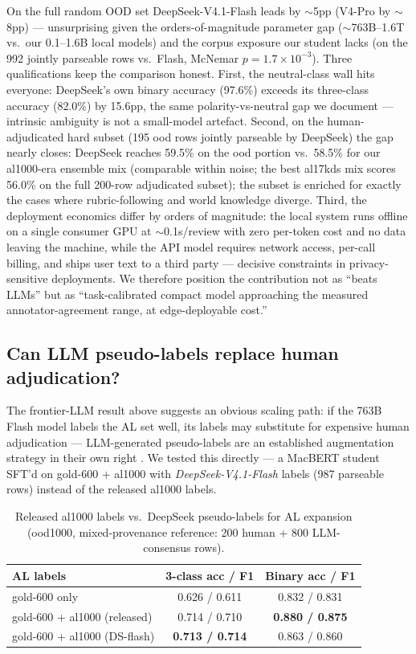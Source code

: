\documentclass[11pt,a4paper]{article}
\begin{document}
On the full random OOD set DeepSeek-V4.1-Flash leads by $\sim$5pp
(V4-Pro by $\sim$8pp) --- unsurprising given the orders-of-magnitude
parameter gap ($\sim$763B--1.6T vs.\ our 0.1--1.6B local models) and
the corpus exposure our student lacks (on the 992
jointly parseable rows vs.\ Flash, McNemar $p = 1.7\times10^{-3}$). Three
qualifications keep the comparison
honest. First, the neutral-class wall hits everyone: DeepSeek's own
binary accuracy (97.6\%) exceeds its three-class accuracy (82.0\%) by
15.6pp, the same polarity-vs-neutral gap we document --- intrinsic
ambiguity is not a small-model artefact. Second, on the human-adjudicated
hard subset (195 ood rows jointly parseable by DeepSeek) the gap
nearly closes: DeepSeek reaches
59.5\% on the ood portion vs.\ 58.5\% for our al1000-era
ensemble mix
(comparable within noise; the best al17kds mix scores 56.0\% on the full
200-row adjudicated subset); the subset is enriched for exactly the
cases
where rubric-following and world knowledge diverge. Third, the
deployment economics differ by orders of magnitude: the local system
runs offline on a single consumer GPU at $\sim$0.1s/review with zero
per-token cost and no data leaving the machine, while the API model
requires network access, per-call billing, and ships user text to a
third party --- decisive constraints in privacy-sensitive deployments.
We therefore position the contribution not as ``beats LLMs'' but as
``task-calibrated compact model approaching the measured
annotator-agreement range, at edge-deployable cost.''

\subsection{Can LLM pseudo-labels replace human adjudication?}
\label{sec:ds-teacher}

The frontier-LLM result above suggests an obvious scaling path: if the
763B Flash model labels the AL set well, its labels may substitute for
expensive human adjudication --- LLM-generated pseudo-labels are an
established augmentation strategy in their own right
\citep{zenimoto2024,neveditsin2025}. We tested this directly --- a
MacBERT
student SFT'd on gold-600 + al1000 with \emph{DeepSeek-V4.1-Flash}
labels (987 parseable rows) instead of the released al1000 labels.

\begin{table}[H]
\centering\small
\caption{Released al1000 labels vs.\ DeepSeek pseudo-labels for AL
expansion (ood1000, mixed-provenance reference: 200 human +
800 LLM-consensus rows).}
\label{tab:ds-teacher}
\begin{tabular}{lcc}
\toprule
AL labels & 3-class acc / F1 & Binary acc / F1 \\
\midrule
gold-600 only              & 0.626 / 0.611 & 0.832 / 0.831 \\
gold-600 + al1000 (released)  & 0.714 / 0.710 & \textbf{0.880 / 0.875} \\
gold-600 + al1000 (DS-flash) & \textbf{0.713 / 0.714} & 0.863 / 0.860 \\
\bottomrule
\end{tabular}
\end{table}
\end{document}
